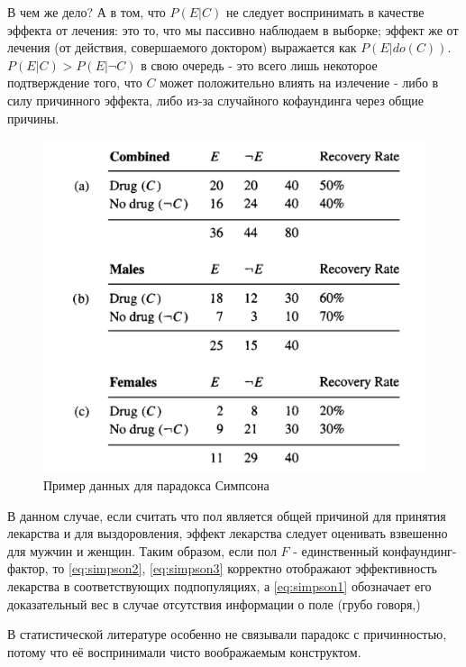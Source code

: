 \documentclass[fleqn]{article}
\numberwithin{equation}{section}
\numberwithin{theorem}{section}
\numberwithin{figure}{section}
\numberwithin{lemma}{section}
\numberwithin{corollary}{section}
\begin{document}
В чем же дело? А в том, что $P(E|C)$ не следует воспринимать в качестве эффекта от лечения: это то, что мы пассивно наблюдаем в выборке; эффект же от лечения (от действия, совершаемого доктором) выражается как $P(E|do(C))$. $P(E|C) > P(E|\neg C)$ в свою очередь - это всего лишь некоторое подтверждение того, что $C$ может положительно влиять на излечение - либо в силу причинного эффекта, либо из-за случайного кофаундинга через общие причины.

\begin{figure}[h]
	\begin{center}
		\includegraphics[scale=0.5]{imgs/img28.png}
	\end{center}
	\caption{Пример данных для парадокса Симпсона}
	\label{fig:simpson}
\end{figure}


В данном случае, если считать что пол является общей причиной для принятия лекарства и для выздоровления, эффект лекарства следует оценивать взвешенно для мужчин и женщин. Таким образом, если пол $F$ - единственный конфаундинг-фактор, то \ref{eq:simpson2}, \ref{eq:simpson3} корректно отображают эффективность лекарства в соответствующих подпопуляциях, а \ref{eq:simpson1} обозначает его доказательный вес в случае отсутствия информации о поле (грубо говоря,)


 В статистической литературе особенно не связывали парадокс с причинностью, потому что её воспринимали чисто воображаемым конструктом. 
 
\end{document}
